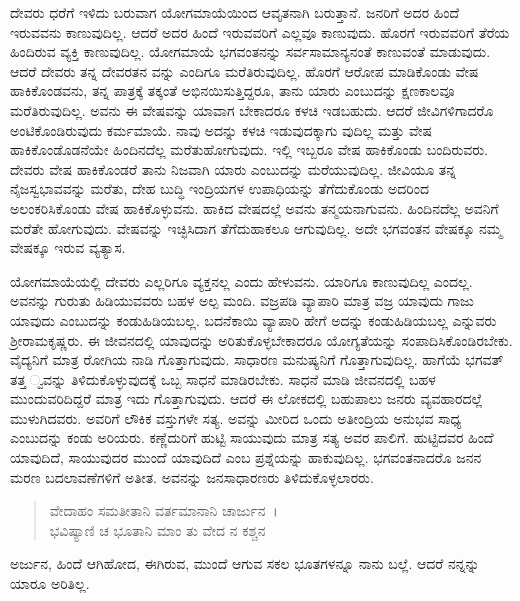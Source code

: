 ದೇವರು ಧರೆಗೆ ಇಳಿದು ಬರುವಾಗ ಯೋಗಮಾಯೆಯಿಂದ ಆವೃತನಾಗಿ ಬರುತ್ತಾನೆ. ಜನರಿಗೆ ಅದರ ಹಿಂದೆ ಇರುವವನು ಕಾಣುವುದಿಲ್ಲ. ಆದರೆ ಅದರ ಹಿಂದೆ ಇರುವವರಿಗೆ ಎಲ್ಲವೂ ಕಾಣುವುದು. ಹೊರಗೆ ಇರುವವರಿಗೆ ತೆರೆಯ ಹಿಂದಿರುವ ವ್ಯಕ್ತಿ ಕಾಣುವುದಿಲ್ಲ. ಯೋಗಮಾಯೆ ಭಗವಂತನನ್ನು ಸರ್ವಸಾಮಾನ್ಯನಂತೆ ಕಾಣುವಂತೆ ಮಾಡುವುದು. ಆದರೆ ದೇವರು ತನ್ನ ದೇವರತನ ವನ್ನು ಎಂದಿಗೂ ಮರೆತಿರುವುದಿಲ್ಲ. ಹೊರಗೆ ಆರೋಪ ಮಾಡಿಕೊಂಡು ವೇಷ ಹಾಕಿಕೊಂಡವನು, ತನ್ನ ಪಾತ್ರಕ್ಕೆ ತಕ್ಕಂತೆ ಅಭಿನಯಿಸುತ್ತಿದ್ದರೂ, ತಾನು ಯಾರು ಎಂಬುದನ್ನು ಕ್ಷಣಕಾಲವೂ ಮರೆತಿರುವುದಿಲ್ಲ. ಅವನು ಈ ವೇಷವನ್ನು ಯಾವಾಗ ಬೇಕಾದರೂ ಕಳಚಿ ಇಡಬಹುದು. ಆದರೆ ಜೀವಿಗಳಿಗಾದರೊ ಅಂಟಿಕೊಂಡಿರುವುದು ಕರ್ಮಮಾಯೆ. ನಾವು ಅದನ್ನು ಕಳಚಿ ಇಡುವುದಕ್ಕಾಗು ವುದಿಲ್ಲ ಮತ್ತು ವೇಷ ಹಾಕಿಕೊಂಡೊಡನೆಯೇ ಹಿಂದಿನದೆಲ್ಲ ಮರೆತುಹೋಗುವುದು. ಇಲ್ಲಿ ಇಬ್ಬರೂ ವೇಷ ಹಾಕಿಕೊಂಡು ಬಂದಿರುವರು. ದೇವರು ವೇಷ ಹಾಕಿಕೊಂಡರೆ ತಾನು ನಿಜವಾಗಿ ಯಾರು ಎಂಬುದನ್ನು ಮರೆಯುವುದಿಲ್ಲ. ಜೀವಿಯೂ ತನ್ನ ನೈಜಸ್ವಭಾವವನ್ನು ಮರೆತು, ದೇಹ ಬುದ್ಧಿ ಇಂದ್ರಿಯಗಳ ಉಪಾಧಿಯನ್ನು ತೆಗೆದುಕೊಂಡು ಅದರಿಂದ ಅಲಂಕರಿಸಿಕೊಂಡು ವೇಷ ಹಾಕಿಕೊಳ್ಳುವನು. ಹಾಕಿದ ವೇಷದಲ್ಲೆ ಅವನು ತನ್ಮಯನಾಗುವನು. ಹಿಂದಿನದೆಲ್ಲ ಅವನಿಗೆ ಮರೆತೇ ಹೋಗುವುದು. ವೇಷವನ್ನು ಇಚ್ಛಿಸಿದಾಗ ತೆಗೆದುಹಾಕಲೂ ಆಗುವುದಿಲ್ಲ. ಅದೇ ಭಗವಂತನ ವೇಷಕ್ಕೂ ನಮ್ಮ ವೇಷಕ್ಕೂ ಇರುವ ವ್ಯತ್ಯಾಸ.

ಯೋಗಮಾಯೆಯಲ್ಲಿ ದೇವರು ಎಲ್ಲರಿಗೂ ವ್ಯಕ್ತನಲ್ಲ ಎಂದು ಹೇಳುವನು. ಯಾರಿಗೂ ಕಾಣುವುದಿಲ್ಲ ಎಂದಲ್ಲ. ಅವನನ್ನು ಗುರುತು ಹಿಡಿಯುವವರು ಬಹಳ ಅಲ್ಪ ಮಂದಿ. ವಜ್ರಪಡಿ ವ್ಯಾಪಾರಿ ಮಾತ್ರ ವಜ್ರ ಯಾವುದು ಗಾಜು ಯಾವುದು ಎಂಬುದನ್ನು ಕಂಡುಹಿಡಿಯಬಲ್ಲ. ಬದನೆಕಾಯಿ ವ್ಯಾಪಾರಿ ಹೇಗೆ ಅದನ್ನು ಕಂಡುಹಿಡಿಯಬಲ್ಲ ಎನ್ನುವರು ಶ‍್ರೀರಾಮಕೃಷ್ಣರು. ಈ ಜೀವನದಲ್ಲಿ ಯಾವುದನ್ನು ಅರಿತುಕೊಳ್ಳಬೇಕಾದರೂ ಯೋಗ್ಯತೆಯನ್ನು ಸಂಪಾದಿಸಿಕೊಂಡಿರಬೇಕು. ವೈದ್ಯನಿಗೆ ಮಾತ್ರ ರೋಗಿಯ ನಾಡಿ ಗೊತ್ತಾಗುವುದು. ಸಾಧಾರಣ ಮನುಷ್ಯನಿಗೆ ಗೊತ್ತಾಗುವುದಿಲ್ಲ. ಹಾಗೆಯೆ ಭಗವತ್ ತತ್ತ ್ವವನ್ನು ತಿಳಿದುಕೊಳ್ಳುವುದಕ್ಕೆ ಒಬ್ಬ ಸಾಧನೆ ಮಾಡಿರಬೇಕು. ಸಾಧನೆ ಮಾಡಿ ಜೀವನದಲ್ಲಿ ಬಹಳ ಮುಂದುವರಿದಿದ್ದರೆ ಮಾತ್ರ ಇದು ಗೊತ್ತಾಗುವುದು. ಆದರೆ ಈ ಲೋಕದಲ್ಲಿ ಬಹುಪಾಲು ಜನರು ವ್ಯವಹಾರದಲ್ಲೆ ಮುಳುಗಿದವರು. ಅವರಿಗೆ ಲೌಕಿಕ ವಸ್ತುಗಳೇ ಸತ್ಯ. ಅವನ್ನು ಮೀರಿದ ಒಂದು ಅತೀಂದ್ರಿಯ ಅನುಭವ ಸಾಧ್ಯ ಎಂಬುದನ್ನು ಕಂಡು ಅರಿಯರು. ಕಣ್ಣೆದುರಿಗೆ ಹುಟ್ಟಿ ಸಾಯುವುದು ಮಾತ್ರ ಸತ್ಯ ಅವರ ಪಾಲಿಗೆ. ಹುಟ್ಟಿದವರ ಹಿಂದೆ ಯಾವುದಿದೆ, ಸಾಯುವುದರ ಮುಂದೆ ಯಾವುದಿದೆ ಎಂಬ ಪ್ರಶ್ನೆಯನ್ನು ಹಾಕುವುದಿಲ್ಲ. ಭಗವಂತನಾದರೊ ಜನನ ಮರಣ ಬದಲಾವಣೆಗಳಿಗೆ ಅತೀತ. ಅವನನ್ನು ಜನಸಾಧಾರಣರು ತಿಳಿದುಕೊಳ್ಳಲಾರರು.

\begin{verse}
ವೇದಾಹಂ ಸಮತೀತಾನಿ ವರ್ತಮಾನಾನಿ ಚಾರ್ಜುನ~।\\ಭವಿಷ್ಯಾಣಿ ಚ ಭೂತಾನಿ ಮಾಂ ತು ವೇದ ನ ಕಶ್ಚನ 
\end{verse}

{\small ಅರ್ಜುನ, ಹಿಂದೆ ಆಗಿಹೋದ, ಈಗಿರುವ, ಮುಂದೆ ಆಗುವ ಸಕಲ ಭೂತಗಳನ್ನೂ ನಾನು ಬಲ್ಲೆ. ಆದರೆ ನನ್ನನ್ನು ಯಾರೂ ಅರಿತಿಲ್ಲ.}

